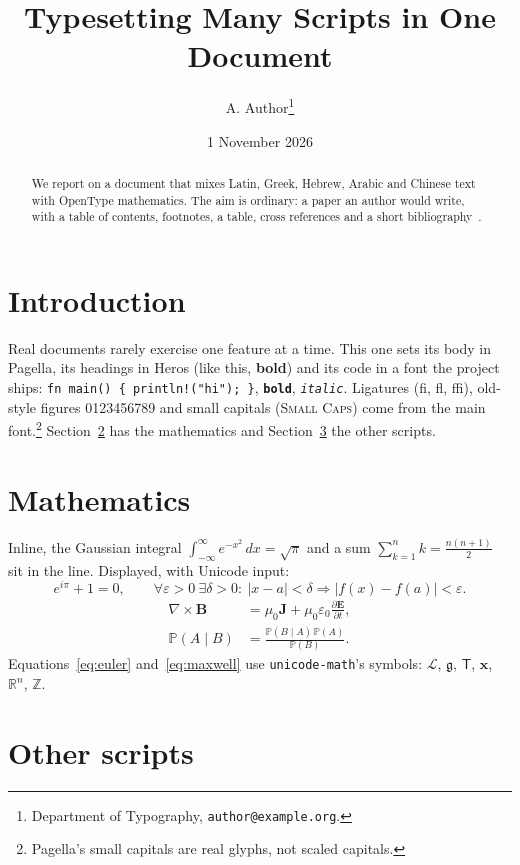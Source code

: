 \documentclass[11pt,a4paper]{article}
\title{Typesetting Many Scripts in One Document}
\author{A. Author\thanks{Department of Typography, \texttt{author@example.org}.}}
\date{1 November 2026}
\begin{document}
\maketitle
\begin{abstract}
We report on a document that mixes Latin, Greek, Hebrew, Arabic and Chinese
text with OpenType mathematics. The aim is ordinary: a paper an author would
write, with a table of contents, footnotes, a table, cross references and a
short bibliography~\cite{knuth, bringhurst}.
\end{abstract}
\tableofcontents

\section{Introduction}\label{s:intro}
Real documents rarely exercise one feature at a time. This one sets its body
in Pagella, its headings in Heros (\textsf{like this, \textbf{bold}}) and its
code in a font the project ships: \texttt{fn main() \{ println!("hi"); \}},
\texttt{\textbf{bold}}, \texttt{\textit{italic}}. Ligatures (fi, fl, ffi),
old-style figures {0123456789} and small
capitals (\textsc{Small Caps}) come from the main font.\footnote{Pagella's
small capitals are real glyphs, not scaled capitals.} Section~\ref{s:math}
has the mathematics and Section~\ref{s:scripts} the other scripts.

\section{Mathematics}\label{s:math}
Inline, the Gaussian integral $\int_{-\infty}^{\infty} e^{-x^2}\,dx=\sqrt{\pi}$
and a sum $\sum_{k=1}^{n} k = \frac{n(n+1)}{2}$ sit in the line. Displayed,
with Unicode input:
\begin{equation}\label{eq:euler}
  e^{iπ} + 1 = 0, \qquad ∀ε>0\ ∃δ>0:\ |x-a|<δ ⇒ |f(x)-f(a)|<ε .
\end{equation}
\begin{align}
  \nabla \times \mathbf{B} &= μ_0 \mathbf{J} + μ_0 ε_0 \frac{∂\mathbf{E}}{∂t}, \label{eq:maxwell}\\
  \mathbb{P}(A \mid B) &= \frac{\mathbb{P}(B \mid A)\,\mathbb{P}(A)}{\mathbb{P}(B)} .
\end{align}
Equations~\eqref{eq:euler} and~\eqref{eq:maxwell} use \verb|unicode-math|'s
symbols: $\mathcal{L}$, $\mathfrak{g}$, $\mathsf{T}$, $\symbf{x}$, $ℝ^n$, $ℤ$.

\section{Other scripts}\label{s:scripts}
\end{document}

